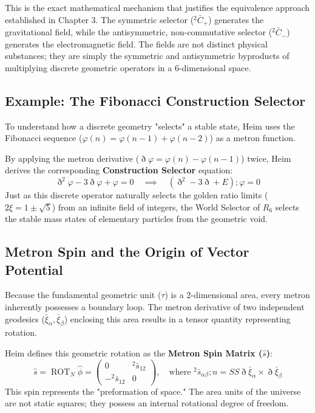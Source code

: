 \documentclass[11pt,a4paper,oneside]{article}
\newcommand{\ethop}{\eth}
\begin{document}
This is the exact mathematical mechanism that justifies the equivalence approach established in Chapter 3. The symmetric selector (${}^2 \bar{C}_+$) generates the gravitational field, while the antisymmetric, non-commutative selector (${}^2 \bar{C}_-$) generates the electromagnetic field. The fields are not distinct physical substances; they are simply the symmetric and antisymmetric byproducts of multiplying discrete geometric operators in a 6-dimensional space.

\subsection{Example: The Fibonacci Construction Selector}
To understand how a discrete geometry "selects" a stable state, Heim uses the Fibonacci sequence ($\varphi(n) = \varphi(n-1) + \varphi(n-2)$) as a metron function. 

By applying the metron derivative ($\ethop\varphi = \varphi(n) - \varphi(n-1)$) twice, Heim derives the corresponding \textbf{Construction Selector} equation:
\begin{equation}
    \ethop^2 \varphi - 3\ethop\varphi + \varphi = 0 \quad \implies \quad (\ethop^2 - 3\ethop + E); \varphi = 0
\end{equation}
Just as this discrete operator naturally selects the golden ratio limits ($2\xi = 1 \pm \sqrt{5}$) from an infinite field of integers, the World Selector of $R_6$ selects the stable mass states of elementary particles from the geometric void. 

\subsection{Metron Spin and the Origin of Vector Potential}

Because the fundamental geometric unit ($\tau$) is a 2-dimensional area, every metron inherently possesses a boundary loop. The metron derivative of two independent geodesics ($\bar{\xi}_\alpha, \bar{\xi}_\beta$) enclosing this area results in a tensor quantity representing rotation. 

Heim defines this geometric rotation as the \textbf{Metron Spin Matrix ($\hat{s}$)}:
\begin{equation}
    \hat{s} = \operatorname{ROT}_N \hat{\phi} = \begin{pmatrix} 0 & {}^2\bar{s}_{12} \\ -{}^2\bar{s}_{12} & 0 \end{pmatrix}, \quad \text{where } {}^2\bar{s}_{\alpha\beta}; n = S S \ethop\bar{\xi}_\alpha \times \ethop\bar{\xi}_\beta
\end{equation}
This spin represents the "preformation of space." The area units of the universe are not static squares; they possess an internal rotational degree of freedom. 
\end{document}
